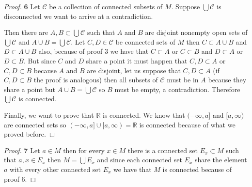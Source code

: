 \documentclass[11pt]{article}
\newcommand{\R}{\mathbb{R}}
\theoremstyle{definition}
\begin{document}
\cleardoublepage
	\begin{proof}{\textbf{6}}
        Let $\mathcal{C}$ be a collection of connected subsets of $M$.
        Suppose $\bigcup \mathcal{C}$ is disconnected we want to arrive at a
        contradiction.

        Then there are $A,B \subset \bigcup \mathcal{C}$ such that $A$ and $B$
        are disjoint nonempty open sets of $\bigcup \mathcal{C}$ and
        $A \cup B = \bigcup \mathcal{C}$. Let $C,D \in \mathcal{C}$ be
        connected sets of $M$ then $C \subset A \cup B$ and $D \subset A \cup B$
        also, because of proof 3 we have that $C \subset A$ or $C \subset B$
        and $D \subset A$ or $D \subset B$. But since $C$ and $D$ share a point
        it must happen that $C,D \subset A$ or $C,D \subset B$ because $A$ and
        $B$ are disjoint, let us suppose that $C,D \subset A$ (if
        $C,D \subset B$ the proof is analogous) then all subsets of
        $\mathcal{C}$ must be in $A$ because they share a point but
        $A \cup B = \bigcup \mathcal{C}$ so $B$ must be empty, a contradiction.
        Therefore $\bigcup \mathcal{C}$ is connected.
        
        Finally, we want to prove that $\R$ is connected. We know that
        $(-\infty, a]$ and $[a,\infty)$ are connected sets so
        $(-\infty, a] \cup [a,\infty) = \R$  is connected because of what we
        proved before.  
    \end{proof}
	\begin{proof}{\textbf{7}}
        Let $a \in M$ then for every $x \in M$ there is a connected set
        $E_x \subset M$ such that $a,x \in E_x$ then $M = \bigcup E_x$ and
        since each connected set $E_x$ share the element $a$ with every other
        connected set $E_x$ we have that  $M$ is connected because of proof 6. 
    \end{proof}
\end{document}
